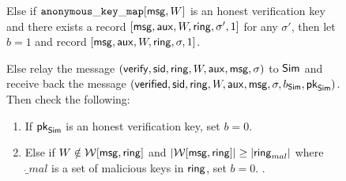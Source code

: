\begin{figure}
\begin{tcolorbox}[left=2pt,right=2pt]
{\begin{list}{\hspace*{1pt} C}{\setlength\leftmargin{0.15in}}
					\label{cond:consistency}
					\item Else if $ \mathtt{anonymous\_key\_map}[\mathsf{msg},W]  $ is an honest verification key and  there exists a record $ [\mathsf{msg},\mathsf{aux}, W,\mathsf{ring}, \sigma', 1] $ for any $ \sigma' $, then let $ b=1 $ and record $ [\mathsf{msg},\mathsf{aux}, W,\mathsf{ring},\sigma, 1] $. 
					\label{cond:differentsignature}
					
					\item \label{cond:malicioussignature}Else relay the message $(\mathsf{verify}, \textsf{sid}, \mathsf{ring},W,\mathsf{aux}, \mathsf{msg}, \sigma)$ to $ \mathsf{Sim} $ and receive back the message $(\mathsf{verified}, \textsf{sid}, \mathsf{ring},W,\mathsf{aux}, \mathsf{msg}, \sigma, b_{\mathsf{Sim}}, \mathsf{pk}_{\mathsf{Sim}})$.  Then check the following:
					
					\begin{enumerate}
						\item If   $ \mathsf{pk}_{\mathsf{Sim}} $ is an honest verification key, set $ b = 0 $. 
						\label{cond:forgery}
						
						\item Else if $ W \notin \mathcal{W}[\mathsf{msg},\mathsf{ring}] $ and $ |\mathcal{W}[\mathsf{msg}, \mathsf{ring}]| \geq |\mathsf{ring}_{mal}| $ where $ \ring_{mal} $ is a set of malicious keys in $ \mathsf{ring} $, set $ b = 0 $.
						\label{cond:uniqueness}.
						

\end{enumerate}
\end{list}}
\end{tcolorbox}
\end{figure}
